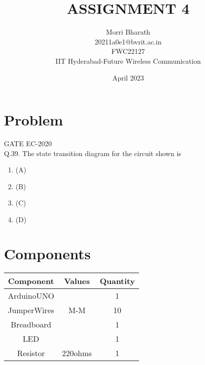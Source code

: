 \documentclass{article}
\title{ASSIGNMENT 4}
\date{April 2023}
\author{Morri Bharath \\20211a0e1@bvrit.ac.in\\FWC22127\\IIT Hyderabad-Future Wireless Communication }
\begin{document}
\maketitle
 \tableofcontents

\pagebreak
\section{Problem}
 {GATE EC-2020}\\
 Q.39. The state transition diagram for the circuit shown is
\begin{figure}[h]
  \centering
  
\end{figure}

\begin{enumerate}
\item{(A)}
        \begin{figure}[h]
         \centering
         
        \end{figure}
\pagebreak
\item{(B)}
        \begin{figure}[h]
          \centering
         
        \end{figure}
\item{(C)}
 \begin{figure}[h]
  \centering
  
 \end{figure}
\item{(D)}
 \begin{figure}[h]
  \centering
  
 \end{figure}
\end{enumerate}
\pagebreak
\section{Components}
 \begin{table}[h]
  \centering
   \begin{tabular}{|c|c|c|}
   \hline
   \textbf{Component}& \textbf{Values} & \textbf{Quantity}\\
\hline
ArduinoUNO &  & 1 \\  
\hline
JumperWires& M-M & 10 \\ 
\hline
Breadboard &  & 1 \\
\hline
LED & &1 \\
\hline
Resistor &220ohms & 1\\
\hline
   \end{tabular}
   \end{table}
\end{document}

